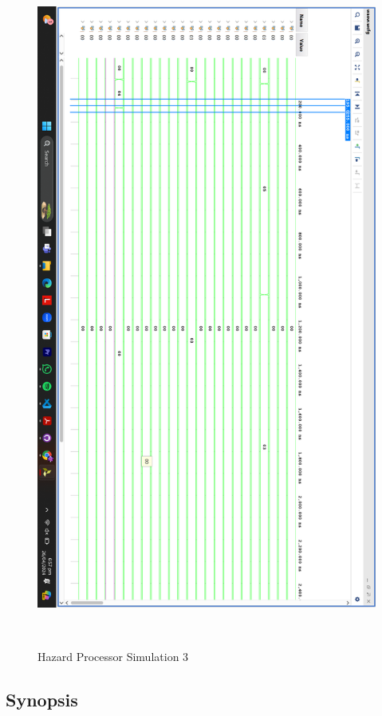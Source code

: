 \documentclass{report}
\begin{document}
  \begin{figure}[h!]
    \centerline{\includegraphics[scale = 0.2]{Hazard 3.png}}
    \caption{Hazard Processor Simulation 3}

  \end{figure}
  
\subsection{Synopsis}
\end{document}
